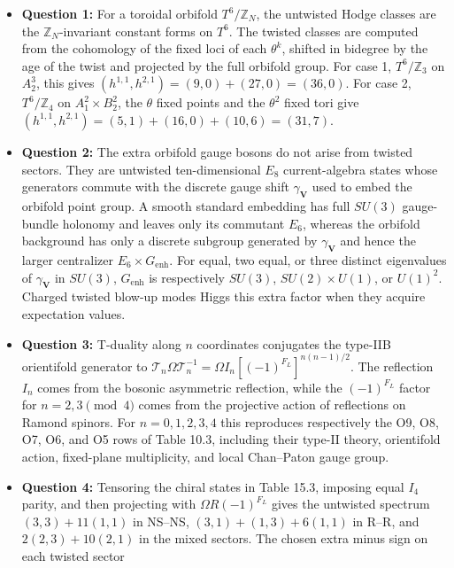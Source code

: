 \documentclass[
  10pt,
  a4paper,
  openany]{book}
\providecommand{\tightlist}{%
  \setlength{\itemsep}{0pt}\setlength{\parskip}{0pt}}
\begin{document}
\begin{itemize}
\tightlist
\item
  \textbf{Question 1:} For a toroidal orbifold \(T^6/\mathbb Z_N\), the
  untwisted Hodge classes are the \(\mathbb Z_N\)-invariant constant
  forms on \(T^6\). The twisted classes are computed from the cohomology
  of the fixed loci of each \(\theta^k\), shifted in bidegree by the age
  of the twist and projected by the full orbifold group. For case 1,
  \(T^6/\mathbb Z_3\) on \(A_2^3\), this gives
  \((h^{1,1},h^{2,1})=(9,0)+(27,0)=(36,0)\). For case 2,
  \(T^6/\mathbb Z_4\) on \(A_1^2\times B_2^2\), the \(\theta\) fixed
  points and the \(\theta^2\) fixed tori give
  \((h^{1,1},h^{2,1})=(5,1)+(16,0)+(10,6)=(31,7)\).
\item
  \textbf{Question 2:} The extra orbifold gauge bosons do not arise from
  twisted sectors. They are untwisted ten-dimensional \(E_8\)
  current-algebra states whose generators commute with the discrete
  gauge shift \(\gamma_{\mathbf V}\) used to embed the orbifold point
  group. A smooth standard embedding has full \(SU(3)\) gauge-bundle
  holonomy and leaves only its commutant \(E_6\), whereas the orbifold
  background has only a discrete subgroup generated by
  \(\gamma_{\mathbf V}\) and hence the larger centralizer
  \(E_6\times G_{\mathrm{enh}}\). For equal, two equal, or three
  distinct eigenvalues of \(\gamma_{\mathbf V}\) in \(SU(3)\),
  \(G_{\mathrm{enh}}\) is respectively \(SU(3)\), \(SU(2)\times U(1)\),
  or \(U(1)^2\). Charged twisted blow-up modes Higgs this extra factor
  when they acquire expectation values.
\item
  \textbf{Question 3:} T-duality along \(n\) coordinates conjugates the
  type-IIB orientifold generator to
  \(\mathcal T_n\Omega\mathcal T_n^{-1}=\Omega I_n[(-1)^{F_L}]^{n(n-1)/2}\).
  The reflection \(I_n\) comes from the bosonic asymmetric reflection,
  while the \((-1)^{F_L}\) factor for \(n=2,3\pmod4\) comes from the
  projective action of reflections on Ramond spinors. For
  \(n=0,1,2,3,4\) this reproduces respectively the O9, O8, O7, O6, and
  O5 rows of Table 10.3, including their type-II theory, orientifold
  action, fixed-plane multiplicity, and local Chan--Paton gauge group.
\item
  \textbf{Question 4:} Tensoring the chiral states in Table 15.3,
  imposing equal \(I_4\) parity, and then projecting with
  \(\Omega R(-1)^{F_L}\) gives the untwisted spectrum \((3,3)+11(1,1)\)
  in NS--NS, \((3,1)+(1,3)+6(1,1)\) in R--R, and \(2(2,3)+10(2,1)\) in
  the mixed sectors. The chosen extra minus sign on each twisted sector

\end{itemize}
\end{document}
